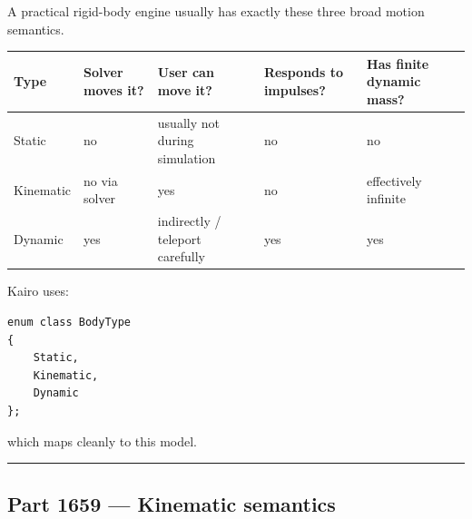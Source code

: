 A practical rigid-body engine usually has exactly these three broad motion semantics.

{\def\LTcaptype{none} %
\begin{longtable}[]{@{}
  >{\raggedright\arraybackslash}p{}
  >{\raggedleft\arraybackslash}p{}
  >{\raggedleft\arraybackslash}p{}
  >{\raggedleft\arraybackslash}p{}
  >{\raggedleft\arraybackslash}p{}@{}}
\toprule\noalign{}
\begin{minipage}[b]{\linewidth}\raggedright
Type
\end{minipage} & \begin{minipage}[b]{\linewidth}\raggedleft
Solver moves it?
\end{minipage} & \begin{minipage}[b]{\linewidth}\raggedleft
User can move it?
\end{minipage} & \begin{minipage}[b]{\linewidth}\raggedleft
Responds to impulses?
\end{minipage} & \begin{minipage}[b]{\linewidth}\raggedleft
Has finite dynamic mass?
\end{minipage} \\
\midrule\noalign{}
\endhead
\bottomrule\noalign{}
\endlastfoot
Static & no & usually not during simulation & no & no \\
Kinematic & no via solver & yes & no & effectively infinite \\
Dynamic & yes & indirectly / teleport carefully & yes & yes \\
\end{longtable}
}

Kairo uses:

\begin{verbatim}
enum class BodyType
{
    Static,
    Kinematic,
    Dynamic
};
\end{verbatim}

which maps cleanly to this model.

\begin{center}\rule{0.5\linewidth}{0.5pt}\end{center}

\subsection{Part 1659 --- Kinematic semantics}\label{06-engine-ii-ch037-part-1659-kinematic-semantics}

